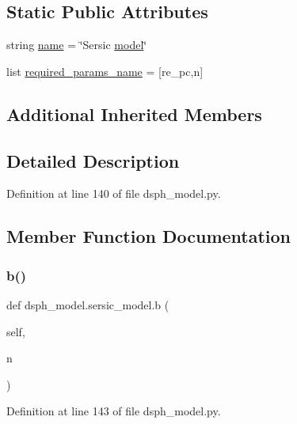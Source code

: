 \subsection*{Static Public Attributes}
\begin{DoxyCompactItemize}
\item 
string \hyperlink{classdsph__model_1_1sersic__model_ab2173ac383d967b9b3ebbb71dde7ed8a}{name} = \char`\"{}Sersic \hyperlink{classdsph__model_1_1model}{model}\char`\"{}
\item 
list \hyperlink{classdsph__model_1_1sersic__model_a19d71ba6a9b6df68453b7bbdfd8c8022}{required\+\_\+params\+\_\+name} = \mbox{[}\textquotesingle{}re\+\_\+pc\textquotesingle{},\textquotesingle{}n\textquotesingle{}\mbox{]}
\end{DoxyCompactItemize}
\subsection*{Additional Inherited Members}


\subsection{Detailed Description}


Definition at line 140 of file dsph\+\_\+model.\+py.



\subsection{Member Function Documentation}
\mbox{\label{classdsph__model_1_1sersic__model_a13e1833567fab6c27dfc49cb80eab9a3}} 
\subsubsection{\texorpdfstring{b()}{b()}}
{\footnotesize\ttfamily def dsph\+\_\+model.\+sersic\+\_\+model.\+b (\begin{DoxyParamCaption}\item[{}]{self,  }\item[{}]{n }\end{DoxyParamCaption})}



Definition at line 143 of file dsph\+\_\+model.\+py.


